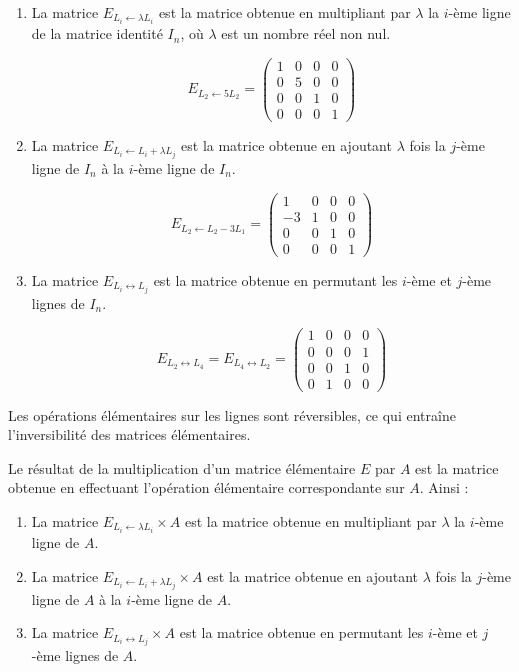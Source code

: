 \documentclass[class=report,crop=false]{standalone}
\begin{document}
\begin{enumerate}
  \item La matrice $E_{L_i \leftarrow \lambda L_i}$ est la matrice obtenue en
    multipliant par $\lambda$ la $i$-ème ligne de la matrice identité $I_n$,
    où $\lambda$ est un nombre réel non nul.


    $$ E_{L_2 \leftarrow 5 L_2}=
    \begin{pmatrix}
    1 & 0 & 0 & 0\\
    0 & 5 & 0 & 0\\
    0 & 0 & 1 & 0\\
    0 & 0 & 0 & 1\end{pmatrix}$$


\item  La matrice $E_{L_i \leftarrow L_i+\lambda L_j}$ est la  matrice
obtenue en ajoutant $\lambda$ fois la $j$-ème ligne de $I_n$ à la $i$-ème ligne de $I_n$.


 $$  E_{L_2 \leftarrow L_2 -3 L_1}=
    \begin{pmatrix}
    1 & 0 & 0 & 0\\
    -3 & 1 & 0 & 0\\
    0 & 0 & 1 & 0\\
    0 & 0 & 0 & 1
    \end{pmatrix}$$



   \item La matrice  $E_{L_i \leftrightarrow L_j}$ est la matrice obtenue
   en permutant les $i$-ème et $j$-ème lignes de $I_n$.

   $$ E_{L_2 \leftrightarrow L_4} = E_{L_4 \leftrightarrow L_2} =
   \begin{pmatrix}
    1 & 0 & 0 & 0\\
    0 & 0 & 0 & 1\\
    0 & 0 & 1 & 0\\
    0 & 1 & 0 & 0
    \end{pmatrix}$$

\end{enumerate}


Les opérations élémentaires sur les lignes sont réversibles,
ce qui entraîne l'inversibilité des matrices élémentaires.

\bigskip

Le résultat de la multiplication d'un matrice élémentaire $E$ par $A$
est la matrice obtenue en effectuant
l'opération élémentaire correspondante sur $A$.
Ainsi :
\begin{enumerate}
  \item La matrice $E_{L_i \leftarrow \lambda L_i} \times A$ est la matrice obtenue en
    multipliant par $\lambda$ la $i$-ème ligne de $A$.

  \item La matrice $E_{L_i \leftarrow L_i+\lambda L_j} \times A$ est la  matrice obtenue
  en ajoutant $\lambda$ fois la $j$-ème ligne de $A$ à la $i$-ème ligne de $A$.

  \item La matrice  $E_{L_i \leftrightarrow L_j} \times A$ est la matrice obtenue
   en permutant les $i$-ème et $j$-ème lignes de $A$.
\end{enumerate}
\end{document}
